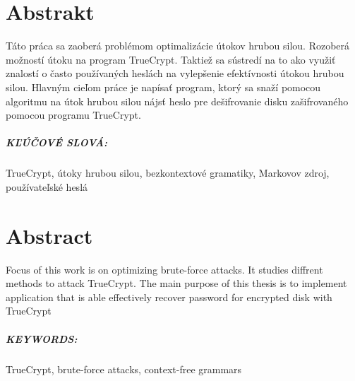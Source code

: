 \chapter*{Abstrakt}
Táto práca sa zaoberá problémom optimalizácie útokov hrubou silou. Rozoberá možností útoku na program TrueCrypt. Taktiež sa sústredí na to ako využiť znalostí o často používaných heslách na vylepšenie efektívnosti útokou hrubou silou. Hlavným cieľom práce je napísať program, ktorý sa snaží pomocou algoritmu na útok hrubou silou nájsť heslo pre dešifrovanie disku zašifrovaného pomocou programu TrueCrypt.

\paragraph{KĽÚČOVÉ SLOVÁ:}
TrueCrypt, útoky hrubou silou, bezkontextové gramatiky, Markovov zdroj, používateľské heslá

\newpage
\chapter*{Abstract}
Focus of this work is on optimizing brute-force attacks. It studies diffrent methods to attack TrueCrypt. The main purpose of this thesis is to implement application that is able effectively recover password for encrypted disk with TrueCrypt

\paragraph{KEYWORDS:}
TrueCrypt, brute-force attacks, context-free grammars